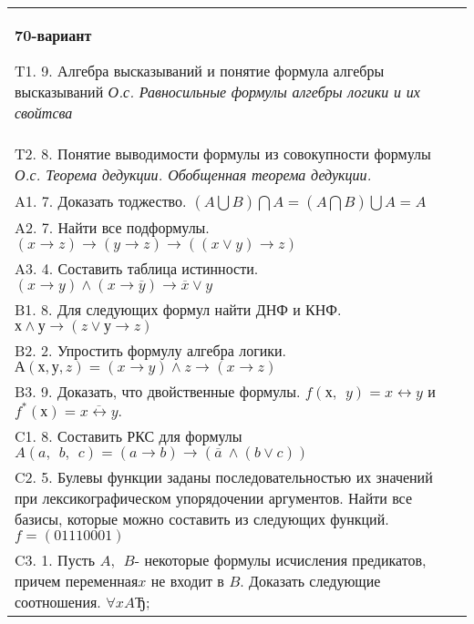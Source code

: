 \documentclass{article}
\begin{document}
\begin{tabular}{m{17cm}}
\textbf{70-вариант}
\newline

T1. 9. Алгебра высказываний и понятие формула алгебры высказываний \emph{О.с. Равносильные формулы алгебры логики и их свойтсва} \\
T2. 8. Понятие выводимости формулы из совокупности формулы \emph{О.с. Теорема дедукции. Обобщенная теорема дедукции.} \\
A1. 7. Доказать тоджество. \((A\bigcup B)\bigcap A = (A\bigcap B)\bigcup A = A\) \\
A2. 7. Найти все подформулы. \((x \rightarrow z) \rightarrow (y \rightarrow z) \rightarrow ((x \vee y) \rightarrow z)\) \\
A3. 4. Составить таблица истинности. \((x \rightarrow y) \land (x \rightarrow \overline{y}) \rightarrow \overline{x} \vee y\) \\
B1. 8. Для следующих формул найти ДНФ и КНФ. \(х \land у \rightarrow (z \vee у \rightarrow z)\) \\
B2. 2. Упростить формулу алгебра логики. \(А(х,у,z) = (x \rightarrow y) \land z \rightarrow (x \rightarrow z)\) \\
B3. 9. Доказать, что двойственные формулы. \(f(х,\ \ y) = x \leftrightarrow y\) и \(f^{*}(х) = \overline{x \leftrightarrow y}.\) \\
C1. 8. Составить РКС для формулы \(A(a,\ \ b,\ \ c) = (a \rightarrow b) \rightarrow (\overline{a}\  \land (b \vee c))\) \\
C2. 5. Булевы функции заданы последовательностью их значений при лексикографическом упорядочении аргументов. Найти все базисы, которые можно составить из следующих функций. \(f = (01110001)\) \\
C3. 1. Пусть \(A,\ \ B\)- некоторые формулы исчисления предикатов, причем переменная\(x\) не входит в \(B\). Доказать следующие соотношения. \(\forall xAЂ\); \\

\end{tabular}
\vspace{1cm}
\end{document}
